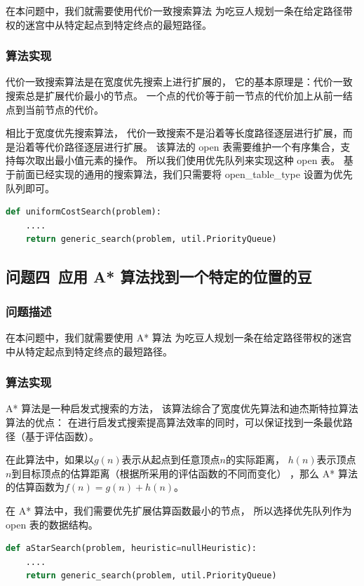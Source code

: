 \documentclass[12pt,onecolumn]{report}
\theoremstyle{plain}
\numberwithin{figure}{section}
\begin{document}
在本问题中，我们就需要使用代价一致搜索算法
为吃豆人规划一条在给定路径带权的迷宫中从特定起点到特定终点的最短路径。

\subsubsection{算法实现}
代价一致搜索算法是在宽度优先搜索上进行扩展的，
它的基本原理是：代价一致搜索总是扩展代价最小的节点。
一个点的代价等于前一节点的代价加上从前一结点到当前节点的代价。

相比于宽度优先搜索算法，
代价一致搜索不是沿着等长度路径逐层进行扩展，而是沿着等代价路径逐层进行扩展。
该算法的 open 表需要维护一个有序集合，支持每次取出最小值元素的操作。
所以我们使用优先队列来实现这种 open 表。
基于前面已经实现的通用的搜索算法，我们只需要将 open\_table\_type 设置为优先队列即可。

\begin{lstlisting}[language=python]
def uniformCostSearch(problem):
    ....
    return generic_search(problem, util.PriorityQueue)
\end{lstlisting}

\subsection{问题四~应用 A* 算法找到一个特定的位置的豆}
\subsubsection{问题描述}
在本问题中，我们就需要使用 A* 算法
为吃豆人规划一条在给定路径带权的迷宫中从特定起点到特定终点的最短路径。

\subsubsection{算法实现}
A* 算法是一种启发式搜索的方法，
该算法综合了宽度优先算法和迪杰斯特拉算法算法的优点：
在进行启发式搜索提高算法效率的同时，可以保证找到一条最优路径（基于评估函数）。

在此算法中，如果以$g(n)$表示从起点到任意顶点$n$的实际距离，
$h(n)$表示顶点$n$到目标顶点的估算距离（根据所采用的评估函数的不同而变化）
，那么 A* 算法的估算函数为$f(n) = g(n) + h(n)$。

在 A* 算法中，我们需要优先扩展估算函数最小的节点，
所以选择优先队列作为 open 表的数据结构。

\begin{lstlisting}[language=python]
def aStarSearch(problem, heuristic=nullHeuristic):
    ....
    return generic_search(problem, util.PriorityQueue)
\end{lstlisting}
\end{document}
